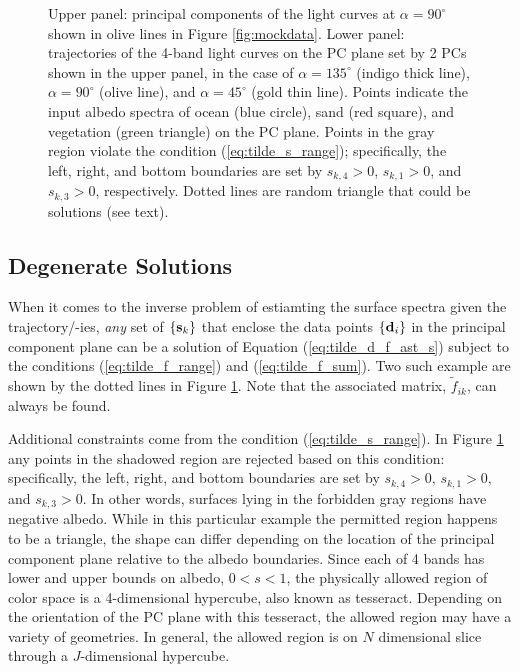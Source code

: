 \documentclass[iop,numberedappendix,apj]{emulateapj}
\def\fast{\tilde f}
\begin{document}
\begin{figure}[t]
\begin{center}
    \end{center}
    \caption{Upper panel: principal components of the light curves at $\alpha = 90^{\circ }$ shown in olive lines in Figure \ref{fig:mockdata}. Lower panel: trajectories of the 4-band light curves on the PC plane set by 2 PCs shown in the upper panel, in the case of $\alpha = 135^{\circ }$ (indigo thick line), $\alpha = 90^{\circ }$ (olive line), and $\alpha = 45^{\circ }$ (gold thin line). Points indicate the input albedo spectra of ocean (blue circle), sand (red square), and vegetation (green triangle) on the PC plane. Points in the gray region violate the condition (\ref{eq:tilde_s_range}); specifically, the left, right, and bottom boundaries are set by $s_{k,4} > 0$, $s_{k,1} > 0$, and $s_{k,3}> 0$, respectively. 
Dotted lines are random triangle that could be solutions (see text). }
    \label{fig:trajectory}
\end{figure}

\subsection{Degenerate Solutions}
\label{ss:degeneracy}

When it comes to the inverse problem of estiamting the surface spectra given the trajectory/-ies, {\it any} set of $\{ {\bf s}_k \}$ that enclose the data points $\{{\bf d}_i\}$ in the principal component plane can be a solution of Equation (\ref{eq:tilde_d_f_ast_s}) subject to the conditions (\ref{eq:tilde_f_range}) and (\ref{eq:tilde_f_sum}). 
Two such example are shown by the dotted lines in Figure \ref{fig:trajectory}. 
Note that the associated matrix, $\fast _{ik}$, can always be found. 

Additional constraints come from the condition (\ref{eq:tilde_s_range}). 
In Figure \ref{fig:trajectory} any points in the shadowed region are rejected based on this condition: specifically, the left, right, and bottom boundaries are set by $s_{k,4}> 0$, $s_{k,1}> 0$, and $s_{k,3}> 0$. 
In other words, surfaces lying in the forbidden gray regions have negative albedo. 
While in this particular example the permitted region happens to be a triangle, the shape can differ depending on the location of the principal component plane relative to the albedo boundaries. 
Since each of 4 bands has lower and upper bounds on albedo, $0<s<1$, the physically allowed region of color space is a 4-dimensional hypercube, also known as tesseract. Depending on the orientation of the PC plane with this tesseract, the allowed region may have a variety of geometries. 
In general, the allowed region is on $N$ dimensional slice through a $J$-dimensional hypercube. 
\end{document}
